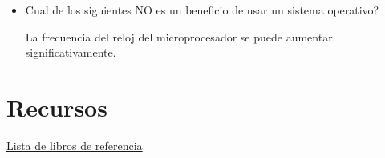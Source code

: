 \documentclass[12pt]{report} %
\begin{document}
\begin{itemize}

\item Cual de los siguientes NO es un beneficio de usar un sistema operativo? 

La frecuencia del reloj del microprocesador se puede aumentar significativamente.
\end{itemize}




\chapter{Recursos}
\href{https://learning.oreilly.com/playlists/5a6c045f-e39c-465e-9e7c-60dcbb12aebb}{Lista de libros de referencia}

\end{document}
